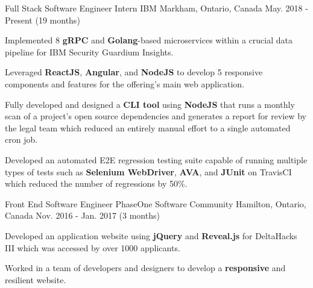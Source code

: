 


\begin{cventries}


\cventry
{Full Stack Software Engineer Intern} %
{IBM} %
{Markham, Ontario, Canada} %
{May. 2018 - Present (19 months)} %
{ %
\begin{cvitems}
\item {Implemented 8 \textbf{gRPC} and \textbf{Golang}-based microservices within a crucial data pipeline for IBM Security Guardium Insights.}
\item {Leveraged \textbf{ReactJS}, \textbf{Angular}, and \textbf{NodeJS} to develop 5 responsive components and features for the offering's main web application.}
\item {Fully developed and designed a \textbf{CLI tool} using \textbf{NodeJS} that runs a monthly scan of a project's open source dependencies and generates a report for review by the legal team which reduced an entirely manual effort to a single automated cron job.}
\item {Developed an automated E2E regression testing suite capable of running multiple types of tests such as \textbf{Selenium WebDriver}, \textbf{AVA}, and \textbf{JUnit} on TravisCI which reduced the number of regressions by 50\%.}
\end{cvitems}
}


\cventry
{Front End Software Engineer} %
{PhaseOne Software Community} %
{Hamilton, Ontario, Canada} %
{Nov. 2016 - Jan. 2017 (3 months)} %
{ %
\begin{cvitems}
\item {Developed an application website using \textbf{jQuery} and \textbf{Reveal.js} for DeltaHacks III which was accessed by over 1000 applicants.}
\item {Worked in a team of developers and designers to develop a \textbf{responsive} and resilient website.}
\end{cvitems}
}


\end{cventries}